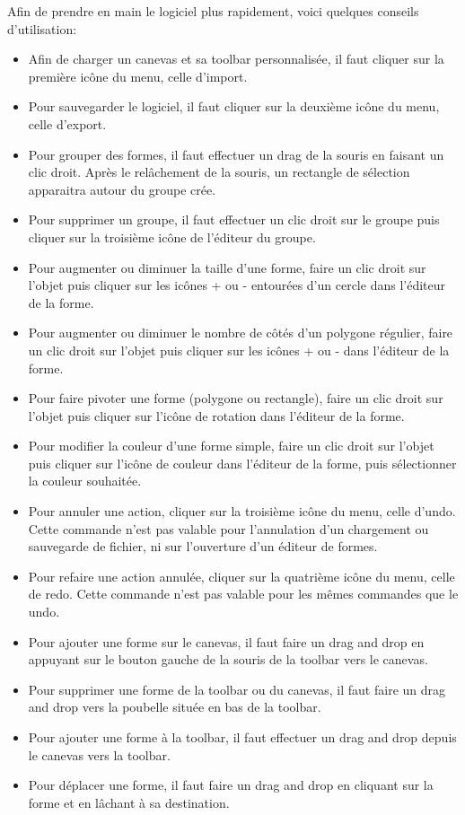 \documentclass{article}
\begin{document}
Afin de prendre en main le logiciel plus rapidement, voici quelques conseils d'utilisation:
\begin{itemize}
    \item Afin de charger un canevas et sa toolbar personnalisée, il faut cliquer sur la première icône du menu, celle d'import.
    \item Pour sauvegarder le logiciel, il faut cliquer sur la deuxième icône du menu, celle d'export.
    \item Pour grouper des formes, il faut effectuer un drag de la souris en faisant un clic droit. Après le relâchement de la souris, un rectangle de sélection 
    apparaitra autour du groupe crée.
    \item Pour supprimer un groupe, il faut effectuer un clic droit sur le groupe puis cliquer sur la troisième icône de l'éditeur du groupe.
    \item Pour augmenter ou diminuer la taille d'une forme, faire un clic droit sur l'objet puis cliquer sur les icônes + ou - entourées d'un cercle dans l'éditeur de la forme.
    \item Pour augmenter ou diminuer le nombre de côtés d'un polygone régulier, faire un clic droit sur l'objet puis cliquer sur les icônes + ou - dans l'éditeur de la forme.
    \item Pour faire pivoter une forme (polygone ou rectangle), faire un clic droit sur l'objet puis cliquer sur l'icône de rotation dans l'éditeur de la forme.
    \item Pour modifier la couleur d'une forme simple, faire un clic droit sur l'objet puis cliquer sur l'icône de couleur dans l'éditeur de la forme, puis sélectionner la couleur souhaitée.
    \item Pour annuler une action, cliquer sur la troisième icône du menu, celle d'undo. Cette commande n'est pas valable pour l'annulation d'un chargement ou sauvegarde de fichier, ni sur l'ouverture d'un éditeur de formes.
    \item Pour refaire une action annulée, cliquer sur la quatrième icône du menu, celle de redo. Cette commande n'est pas valable pour les mêmes commandes que le undo.
    \item Pour ajouter une forme sur le canevas, il faut faire un drag and drop en appuyant sur le bouton gauche de la souris de la toolbar vers le canevas.
    \item Pour supprimer une forme de la toolbar ou du canevas, il faut faire un drag and drop vers la poubelle située en bas de la toolbar.
    \item Pour ajouter une forme à la toolbar, il faut effectuer un drag and drop depuis le canevas vers la toolbar.
    \item Pour déplacer une forme, il faut faire un drag and drop en cliquant sur la forme et en lâchant à sa destination.
\end{itemize}
\end{document}
